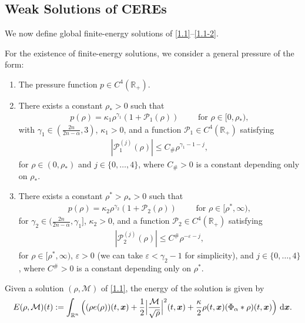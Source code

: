 \documentclass[reqno,11pt]{amsart}
\numberwithin{equation}{section}
\theoremstyle{definition}
\def\dd{{\, \rm d}}
\begin{document}
\subsection{Weak Solutions of CEREs}

We now define global finite-energy solutions of \eqref{1.1}--\eqref{1.1-2}.

For the existence of finite-energy solutions, we consider a general pressure of the form:
\begin{enumerate}
    \item[(a)] The pressure function $p \in C^4(\mathbb{R}_+)$.
    \item[(b)] There exists a constant $\rho_* > 0$ such that
    \begin{align}\label{1.2}
  p(\rho) = \kappa_1 \rho^{\gamma_1}(1 + \mathcal{P}_1(\rho)) \qquad \text{ for } \rho \in [0,\rho_*),
    \end{align}
    with $\gamma_1 \in (\frac{2n}{2n - \alpha},3)$, $\kappa_1 > 0$, and a function $\mathcal{P}_1 \in C^4(\mathbb{R}_+)$ satisfying
    \begin{align}\label{1.3}
 |\mathcal{P}^{(j)}_1(\rho)| \leq C_\#\rho^{\gamma_1 - 1 - j},
    \end{align}
    for $\rho \in (0,\rho_*)$ and $j \in \{0,\dots,4\}$, where $C_\# > 0$ is a constant depending only on $\rho_*$.
    \item[(c)] There exists a constant $\rho^* > \rho_* > 0$ such that
    \begin{align}\label{1.4}
  p(\rho) = \kappa_2 \rho^{\gamma_2}(1 + \mathcal{P}_2(\rho)) \qquad \text{ for } \rho \in [\rho^*,\infty),
    \end{align}
    for $\gamma_2 \in (\frac{2n}{2n - \alpha},\gamma_1]$, $\kappa_2 >0$, and a function $\mathcal{P}_2 \in C^4(\mathbb{R}_+)$ satisfying
    \begin{align}\label{1.5}
 |\mathcal{P}^{(j)}_2(\rho)| \leq C^\#\rho^{- \varepsilon - j},
    \end{align}
    for $\rho \in [\rho^*,\infty)$, $\varepsilon > 0$ (we can take $\varepsilon < \gamma_2 - 1$ for simplicity), and $j \in \{0,\dots,4\}$, where $C^\# > 0$ is a constant depending only on $\rho^*$.
\end{enumerate}

\smallskip
Given a solution $(\rho,\mathcal{M})$ of \eqref{1.1}, the energy of the solution is given by
\begin{equation}\label{energies}
E(\rho,\mathcal{M})(t)
:= \int_{\mathbb{R}^n}\Big((\rho e(\rho))(t,\boldsymbol{x})
+ \frac{1}{2} \Big|\frac{\mathcal{M}}{\sqrt{\rho}}\Big|^2(t,\boldsymbol{x}) + \frac{\kappa}{2}\rho(t,\boldsymbol{x})(\Phi_\alpha \ast \rho)(t,\boldsymbol{x})\Big)\,\dd\boldsymbol{x}.
\end{equation}
\end{document}
